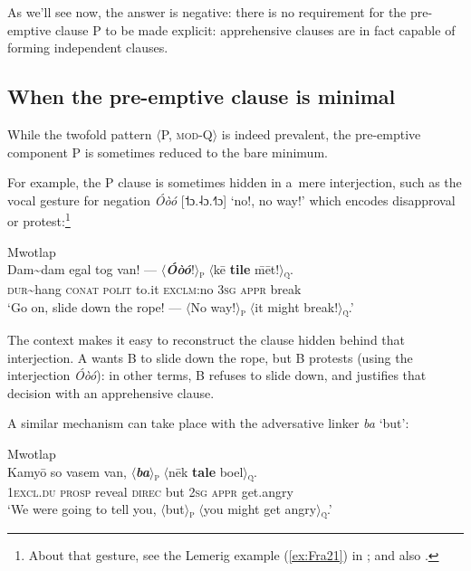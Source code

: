 \documentclass[output=paper,colorlinks,citecolor=brown]{langscibook}
\begin{document}
As we'll see now, the answer is negative: there is no requirement for the pre-emptive clause P to be made explicit: apprehensive clauses are in fact capable of forming independent clauses. 





\subsection{When the pre-emptive clause is minimal}
\label{subsec:minimal}
 
While the twofold pattern ${\langle}$P, \textsc{mod-}Q${\rangle}$ is indeed prevalent, the pre-emptive component P is sometimes reduced to the bare minimum. 

For example, the P clause is sometimes hidden in a~mere interjection, such as the vocal gesture for negation  \textit{Óòó} [\textsf{˦}ɔ.\textsf{˨}ɔ.\textsf{˧˥}ɔ]  `no!, no way!' which encodes disapproval or protest:\footnote{About that gesture, see the Lemerig example (\ref{ex:Fra21}) in ; and also \citet[220]{François2011}.}



\ea \label{ex:Fra43} \textnormal{Mwotlap}  \\
\gll Dam\textasciitilde dam egal tog van! --- ${\langle}$\textbf{\textit{Óòó}}!${\rangle}$\textnormal{\textsc{\textsubscript{p}}}  ${\langle}$kē \textbf{tile} \={m}ēt!${\rangle}$\textnormal{\textsc{\textsubscript{q}}}. \\
\textsc{dur}\textasciitilde hang \textsc{conat} \textsc{polit} to.it {} \textsc{exclm}:no \textsc{3sg} \textsc{appr} break \\
\glt `Go on, slide down the rope! --- $\langle$No way!$\rangle$\textsubscript{\textsc{p}} $\langle$it might break!$\rangle$\textsubscript{\textsc{q}}.' \\
\z


\noindent The context makes it easy to reconstruct the clause hidden behind that interjection. A wants B to slide down the rope, but B protests (using the interjection \textit{Óòó}): in other terms, B refuses to slide down, and justifies that decision with an apprehensive clause.

A similar mechanism can take place with the adversative linker \textit{ba} `but':
 
\ea \label{ex:Fra44} \textnormal{Mwotlap}  \\
\gll Kamyō so vasem van, ${\langle}$\textbf{\textit{ba}}${\rangle}$\textnormal{\textsc{\textsubscript{p}}}  ${\langle}$nēk \textbf{tale} boel${\rangle}$\textnormal{\textsc{\textsubscript{q}}}. \\
\textsc{1excl.du} \textsc{prosp} reveal \textsc{direc} but \textsc{2sg} \textsc{appr} get.angry \\
\glt `We were going to tell you, ${\langle}$but${\rangle}$\textsc{\textsubscript{p}} ${\langle}$you might get angry${\rangle}$\textsc{\textsubscript{q}}.' \\
\z
\end{document}
